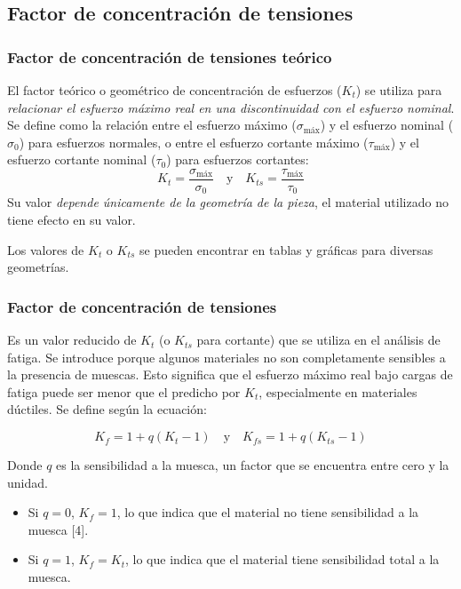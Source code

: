 \documentclass[spanish,11pt,a4paper]{article}
\begin{document}
	\subsection{Factor de concentración de tensiones}
	
	\subsubsection{Factor de concentración de tensiones teórico}
		El factor teórico o geométrico de concentración de esfuerzos ($K_t$) se utiliza para \emph{relacionar el esfuerzo máximo real en una discontinuidad con el esfuerzo nominal}. Se define como la relación entre el esfuerzo máximo ($\sigma_{\text{máx}}$) y el esfuerzo nominal ($\sigma_0$) para esfuerzos normales, o entre el esfuerzo cortante máximo ($\tau_{\text{máx}}$) y el esfuerzo cortante nominal ($\tau_0$) para esfuerzos cortantes:
		\begin{equation*}
			K_t = \dfrac{\sigma_{\text{máx}}}{\sigma_0} \quad \text{y} \quad K_{ts} = \dfrac{\tau_{\text{máx}}}{\tau_0}
		\end{equation*}
		Su valor \emph{depende únicamente de la geometría de la pieza}, el material utilizado no tiene efecto en su valor.
		
		Los valores de $K_t$ o $K_{ts}$ se pueden encontrar en tablas y gráficas para diversas geometrías.
	\subsubsection{Factor de concentración de tensiones}
	Es un valor reducido de $K_t$ (o $K_{ts}$ para cortante) que se utiliza en el análisis de fatiga. Se introduce porque algunos materiales no son completamente sensibles a la presencia de muescas. Esto significa que el esfuerzo máximo real bajo cargas de fatiga puede ser menor que el predicho por $K_t$, especialmente en materiales dúctiles. Se define según la ecuación:
	\begin{tcolorbox}\begin{equation*}
			K_f = 1 + q(K_t - 1) \quad \text{y} \quad K_{fs} = 1 + q(K_{ts} - 1)
		\end{equation*}
	\end{tcolorbox}
	Donde $q$ es la sensibilidad a la muesca, un factor que se encuentra entre cero y la unidad.
	\begin{itemize}
		\item Si $q = 0$, $K_f = 1$, lo que indica que el material no tiene sensibilidad a la muesca [4].
		\item Si $q = 1$, $K_f = K_t$, lo que indica que el material tiene sensibilidad total a la muesca.
	\end{itemize}
	
\end{document}
